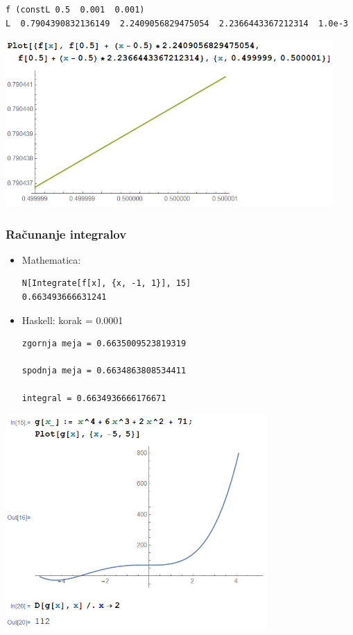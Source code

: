 \documentclass[9pt,table]{beamer}
\begin{document}
\begin{frame}[fragile]
\begin{verbatim}
f (constL 0.5  0.001  0.001)
L  0.7904390832136149  2.2409056829475054  2.2366443367212314  1.0e-3
\end{verbatim}\pause
\includegraphics[width=12.5cm]{graf6.png}
\end{frame}

\begin{frame}[fragile]
\frametitle{Računanje integralov}
\begin{itemize}
\item Mathematica:
\begin{verbatim}
N[Integrate[f[x], {x, -1, 1}], 15]
0.663493666631241
\end{verbatim}
\pause
\vspace{7mm}
\item Haskell: korak = 0.0001
\begin{verbatim}
zgornja meja = 0.6635009523819319

spodnja meja = 0.6634863808534411

integral = 0.6634936666176671
\end{verbatim}
\end{itemize}
\end{frame}





\begin{frame}[fragile]
\includegraphics[width=10cm]{graf7.png}
\end{frame}
\end{document}
